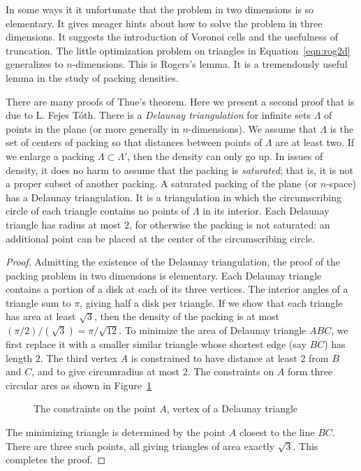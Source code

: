 In some ways it it unfortunate that the problem in two dimensions is so
elementary.  It gives meager hints about how to solve the problem in
three dimensions.   It suggests the
introduction of Voronoi cells and the usefulness of truncation.
The little optimization problem on triangles in Equation~\ref{eqn:rog2d}
generalizes to $n$-dimensions.  This is Rogers's lemma.  It is a tremendously useful lemma in the study of packing densities.


\bigskip

There are many proofs of Thue's theorem.  Here we present a second proof
that is due to L. Fejes T\'oth.  
There is a {\it Delaunay triangulation} for infinite sets $\Lambda$
of points in the plane (or more generally in $n$-dimensions).  We
assume that $\Lambda$ is the set of centers of packing so that
distances between points of $\Lambda$ are at least two.  
If we enlarge a packing
$\Lambda\subset\Lambda'$, then the density can only go up.  In issues
of density, it does no harm to assume that the packing is {\it saturated}; that is, it is not a proper subset of another packing.  A saturated
packing of the plane (or $n$-space) has a Delaunay triangulation.  It
is a triangulation in which the circumscribing circle of each triangle
contains no points of $\Lambda$ in its interior.   Each Delaunay
triangle has
radius at most $2$, for otherwise the packing is not saturated: an additional point can be placed at the center of the circumscribing circle.

\begin{proof}
Admitting the existence of the Delaunay triangulation, the proof 
of the packing problem in two dimensions is
elementary.  Each Delaunay triangle contains a portion of a disk at each of
its three vertices.  The interior angles of a triangle sum to $\pi$, giving
half a disk per triangle.  If we show that each triangle has area at least
$\sqrt{3}$, then the density of the packing is at most
 $(\pi/2)/(\sqrt{3}) = \pi/\sqrt{12}$.  To minimize the area of Delaunay
triangle $ABC$, we first replace it with a smaller similar triangle whose
shortest edge (say $BC$) has length $2$.  The third vertex $A$ is constrained
to have distance at least $2$ from $B$ and $C$, and to give circumradius at most $2$.  The constraints on $A$ form three circular
arcs as shown in Figure~\ref{fig:2D-FT} %

\begin{figure}[htb]
  \centering
  \caption{The constraints on the point $A$, vertex of a Delaunay triangle}
  \label{fig:2D-FT}
\end{figure}

The minimizing triangle is determined by the point $A$ closest to the
line $BC$.  There are three such points, all giving triangles of area
exactly $\sqrt3$.  This completes the proof.
\end{proof}



\clearpage






